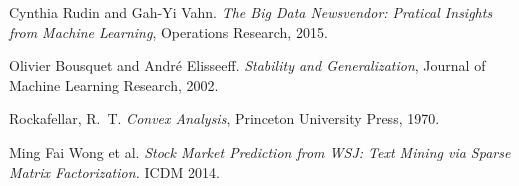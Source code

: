 \begin{thebibliography}{99}

  Cynthia Rudin and Gah-Yi Vahn. \textit{The Big Data Newsvendor: Pratical Insights from
    Machine Learning}, Operations Research, 2015.

  Olivier Bousquet and André Elisseeff. \textit{Stability and Generalization}, Journal of
  Machine Learning Research, 2002.

  Rockafellar, R.~T. \emph{Convex Analysis}, Princeton University Press, 1970.

 Ming Fai Wong et al. \emph{Stock Market Prediction from WSJ: Text Mining via
    Sparse Matrix Factorization.} ICDM 2014. 

\end{thebibliography}
